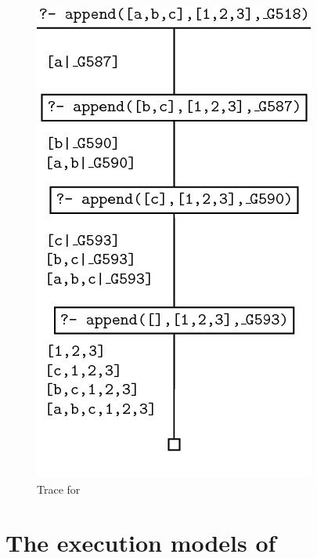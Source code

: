 \documentclass[thesis-solanki.tex]{subfiles}
\begin{document}
\begin{figure}[H]
\centering
\includegraphics[scale = 0.5]{PrologAppendWorking.png}
\caption{Trace for  \cite{webiste:learnprolognowappend}}
\label{fig:Trace for append}
\end{figure}


\section[{The execution models of \progLang{Prolog}}]{The execution models of }\label{sec:exec-models-prolog}
\end{document}
